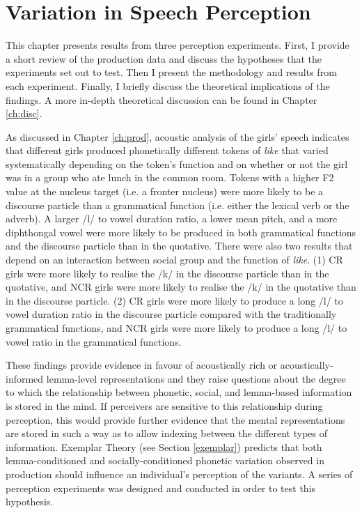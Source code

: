 \date{}
\chapter{Variation in Speech Perception}
\label{ch:perc}

\noindent This chapter presents results from three perception experiments.  First, I provide a short review of the production data and discuss the hypotheses that the experiments set out to test.  Then I present the methodology and results from each experiment.  Finally, I briefly discuss the theoretical implications of the findings.  A more in-depth theoretical discussion can be found in Chapter \ref{ch:disc}.

As discussed in Chapter \ref{ch:prod}, acoustic analysis of the girls' speech indicates that different girls produced phonetically different tokens of \textit{like} that varied systematically depending on the token's function and on whether or not the girl was in a group who ate lunch in the common room.  Tokens with a higher F2 value at the nucleus target (i.e. a fronter nucleus) were more likely to be a discourse particle than a grammatical function (i.e. either the lexical verb or the adverb).  A larger /l/ to vowel duration ratio, a lower mean pitch, and a more diphthongal vowel were more likely to be produced in both grammatical functions and the discourse particle than in the quotative.  There were also two results that depend on an interaction between social group and the function of \textit{like}. (1) CR girls were more likely to realise the /k/ in the discourse particle than in the quotative, and NCR girls were more likely to realise the /k/ in the quotative than in the discourse particle. (2) CR girls were more likely to produce a long /l/ to vowel duration ratio in the discourse particle compared with the traditionally grammatical functions, and NCR girls were more likely to produce a long /l/ to vowel ratio in the grammatical functions.  

These findings provide evidence in fa\-vour of acous\-tically rich or acous\-ti\-cally-informed lemma-level representations and they raise questions about the degree to which the relationship between phonetic, social, and lemma-based information is stored in the mind.  If perceivers are sensitive to this relationship during perception, this would provide further evidence that the mental representations are stored in such a way as to allow indexing between the different types of information.  Exemplar Theory (see Section \ref{exemplar}) predicts that both lemma-conditioned and socially-conditioned phonetic variation observed in production should influence an individual's perception of the variants.  A series of perception experiments was designed and conducted in order to test this hypothesis.

